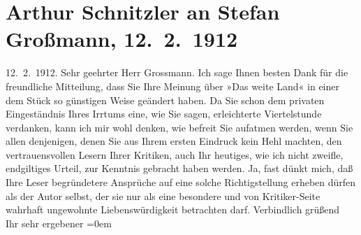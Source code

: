 

               \section[Arthur Schnitzler an Stefan Großmann, 12. 2. 1912]{ Arthur Schnitzler an Stefan Großmann, 12. 2. 1912}\nopagebreak{}\rehead{ }\begin{ledgroupsized}[t]{13cm}\normalsize\beginnumbering{} \toendnotes[C]{\smallbreak\pagebreak[2]} 
\pstart
           \raggedleft{}{\pb}12. 2. 1912.\pend
           \pstart{}Sehr geehrter Herr Grossmann.\pend\pstart
           Ich sage Ihnen besten Dank für die freundliche Mitteilung, dass Sie Ihre Meinung
                    über »Das weite Land« in einer dem Stück so
                    günstigen Weise geändert haben. Da Sie schon dem privaten Eingeständnis Ihres
                    Irrtums eine, wie Sie sagen, erleichterte Viertelstunde verdanken, kann ich mir
                    wohl denken, wie befreit Sie aufatmen werden, wenn Sie allen denjenigen,
                    {\pb}denen Sie aus Ihrem ersten Eindruck kein Hehl machten, den vertrauensvollen
                    Lesern Ihrer Kritiken, auch Ihr heutiges, wie ich nicht zweifle, endgiltiges
                    Urteil, zur Kenntnis gebracht haben werden. Ja, fast dünkt mich, daß Ihre Leser
                    begründetere Ansprüche auf eine solche Richtigstellung erheben dürfen als der
                    Autor selbst, der sie nur als eine besondere und von Kritiker-Seite wahrhaft
                    ungewohnte Liebenswürdigkeit betrachten darf.\pend
           \pstart
           Verbindlich grüßend{\\[\baselineskip]}Ihr sehr ergebener\pend
           \leftskip=0em{}          \endnumbering{}\end{ledgroupsized}  \newcommand{\dateiname}{L02054}\newcommand{\titel}{Arthur Schnitzler an Stefan Großmann, 12. 2. 1912}\newcommand{\editorInnen}{Martin Anton Müller und Gerd-Hermann Susen}
      